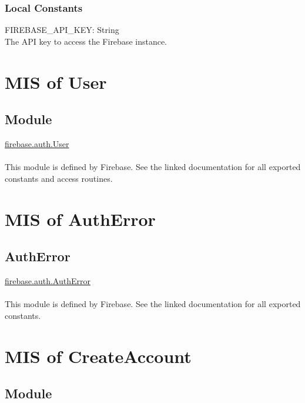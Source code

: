 \documentclass[12pt, titlepage]{article}
\begin{document}
\subsubsection{Local Constants}

FIREBASE\_API\_KEY: String \\
The API key to access the Firebase instance.
  
\medskip
\newpage
\section{MIS of User} \label{User} 

\subsection{Module}

\href{https://firebase.google.com/docs/reference/js/v8/firebase.User}{firebase.auth.User} \\ \\
This module is defined by Firebase. See the linked documentation for all exported constants and access routines.
  
\medskip
\newpage
\section{MIS of AuthError} \label{AuthError} 

\subsection{AuthError}

\href{https://firebase.google.com/docs/reference/js/auth.autherror}{firebase.auth.AuthError} \\ \\
This module is defined by Firebase. See the linked documentation for all exported constants.
  
\medskip
\newpage
\section{MIS of CreateAccount} \label{CreateAccount} 

\subsection{Module}
\end{document}
